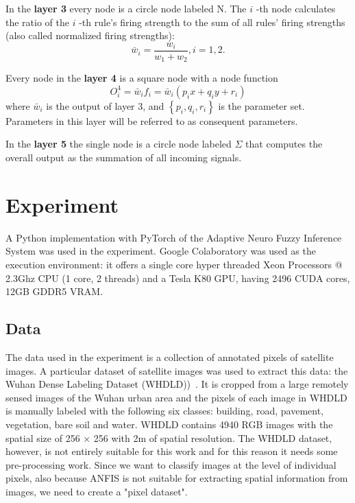 \documentclass[10pt,twocolumn,letterpaper]{article}
\begin{document}
In the \textbf{layer 3} every node is a circle node labeled $\mathrm{N}$. The $i$ -th node calculates the ratio of the $i$ -th rule's firing strength to the sum of all rules' firing strengths (also called normalized firing strengths):
$$
\bar{w}_{i}=\frac{w_{i}}{w_{1}+w_{2}}, i=1,2 .
$$

Every node in the \textbf{layer 4} is a square node with a node function
$$
O_{i}^{4}=\bar{w}_{i} f_{i}=\bar{w}_{i}\left(p_{i} x+q_{i} y+r_{i}\right)
$$
where $\bar{w}_{i}$ is the output of layer 3, and $\left\{p_{i}, q_{i}, r_{i}\right\}$ is the parameter set. Parameters in this layer will be referred to as consequent parameters.

In the \textbf{layer 5} the single node is a circle node labeled $\Sigma$ that computes the overall output as the summation of all incoming signals.

\section{Experiment}

A Python implementation with PyTorch of the Adaptive Neuro Fuzzy Inference System was used in the experiment. Google Colaboratory was used as the execution environment: it offers a single core hyper threaded Xeon Processors @ 2.3Ghz CPU (1 core, 2 threads) and a Tesla K80 GPU, having 2496 CUDA cores, 12GB GDDR5 VRAM.

\subsection{Data}

The data used in the experiment is a collection of annotated pixels of satellite images.
A particular dataset of satellite images was used to extract this data: the Wuhan Dense Labeling Dataset (WHDLD))~\cite{WHDLD}. It is cropped from a large remotely sensed images of the Wuhan urban area and the pixels of each image in WHDLD is manually labeled with the following six classes: building, road, pavement, vegetation, bare soil and water. WHDLD contains 4940 RGB images with the spatial size of 256 × 256 with 2m of spatial resolution. 
The WHDLD dataset, however, is not entirely suitable for this work and for this reason it needs some pre-processing work. Since we want to classify images at the level of individual pixels, also because ANFIS is not suitable for extracting spatial information from images, we need to create a "pixel dataset".
\end{document}
